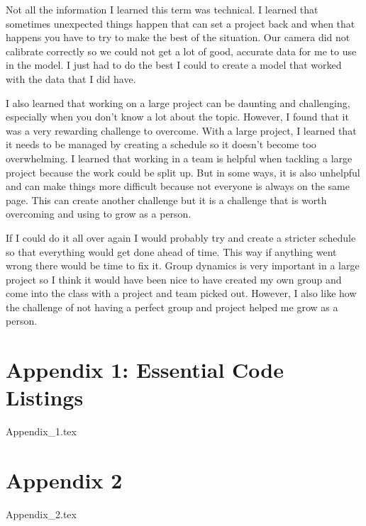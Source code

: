 \documentclass[onecolumn, draftclsnofoot,10pt, compsoc]{IEEEtran}
\begin{document}
Not all the information I learned this term was technical. I learned that sometimes unexpected things happen that can set a project back and when that happens you have to try to make the best of the situation. Our camera did not calibrate correctly so we could not get a lot of good, accurate data for me to use in the model. I just had to do the best I could to create a model that worked with the data that I did have.

I also learned that working on a large project can be daunting and challenging, especially when you don't know a lot about the topic. However, I found that it was a very rewarding challenge to overcome. With a large project, I learned that it needs to be managed by creating a schedule so it doesn't become too overwhelming. I learned that working in a team is helpful when tackling a large project because the work could be split up. But in some ways, it is also unhelpful and can make things more difficult because not everyone is always on the same page. This can create another challenge but it is a challenge that is worth overcoming and using to grow as a person. 

If I could do it all over again I would probably try and create a stricter schedule so that everything would get done ahead of time. This way if anything went wrong there would be time to fix it. Group dynamics is very important in a large project so I think it would have been nice to have created my own group and come into the class with a project and team picked out. However, I also like how the challenge of not having a perfect group and project helped me grow as a person.
	
	\section{Appendix 1: Essential Code Listings}
		{Appendix_1.tex}
	\newpage
	\section{Appendix 2}
		{Appendix_2.tex}
	\newpage
	
	
	
	
	
\end{document}
